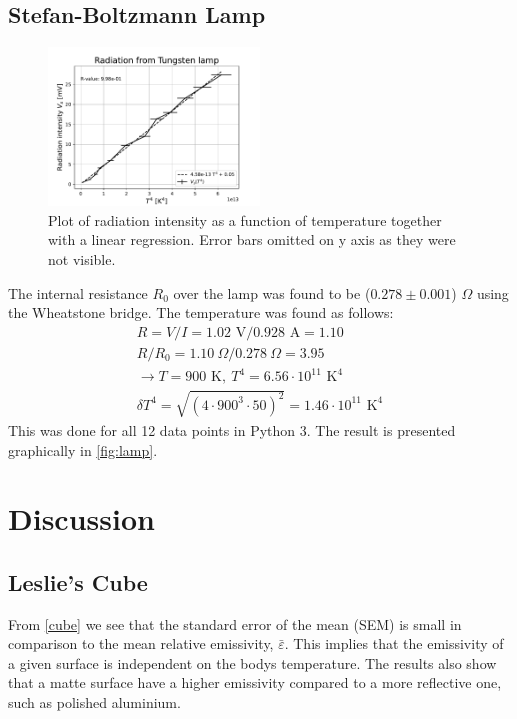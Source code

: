 \documentclass[5p,sort&compress]{elsarticle}
\begin{document}
\subsection{Stefan-Boltzmann Lamp}
\begin{figure}[h]
    \centering
    \includegraphics[width=0.5\textwidth]{../lamp.pdf}
    \caption{Plot of radiation intensity as a function of temperature together with a linear regression. Error bars omitted on y axis as they were not visible.}
    \label{fig:lamp}
\end{figure}

The internal resistance $R_0$ over the lamp was found to be ($0.278 \pm 0.001$) $\Omega$ using the Wheatstone bridge. The temperature was found as follows:
\begin{align*}
    R = V/I = 1.02 \text{ V} / 0.928 \text{ A} = 1.10 \\
    R / R_0 = 1.10 \ \Omega / 0.278 \  \Omega = 3.95 \\
    \rightarrow T = 900 \text{ K},\ T^4 = 6.56\cdot10^{11} \text{ K}^4 \\
    \delta T^4 = \sqrt{(4 \cdot 900^3 \cdot 50)^2} = 1.46\cdot 10^{11} \text{ K}^4
\end{align*}
This was done for all 12 data points in Python 3. The result is presented graphically in \autoref{fig:lamp}.

\section{Discussion}
\subsection{Leslie's Cube}
From \autoref{cube} we see that the standard error of the mean (SEM) is small in comparison to the mean relative emissivity, $\bar\varepsilon$. This implies that the emissivity of a given surface is independent on the bodys temperature. The results also show that a matte surface have a higher emissivity compared to a more reflective one, such as polished aluminium.
\end{document}
